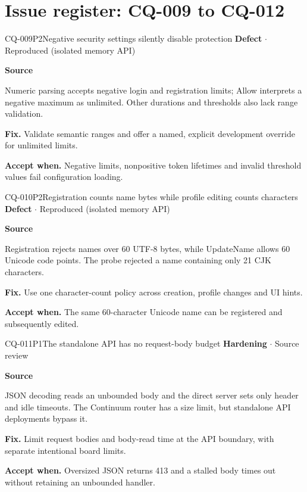 \section*{Issue register: CQ-009 to CQ-012}
\begin{finding}{CQ-009}{P2}{Negative security settings silently disable protection}
\textbf{Defect} $\cdot$ Reproduced (isolated memory API)\par
\textbf{Source}\quad{}\par
Numeric parsing accepts negative login and registration limits; Allow interprets a negative maximum as unlimited. Other durations and thresholds also lack range validation.\par
\textbf{Fix.} Validate semantic ranges and offer a named, explicit development override for unlimited limits.\par
\textbf{Accept when.} Negative limits, nonpositive token lifetimes and invalid threshold values fail configuration loading.
\end{finding}
\begin{finding}{CQ-010}{P2}{Registration counts name bytes while profile editing counts characters}
\textbf{Defect} $\cdot$ Reproduced (isolated memory API)\par
\textbf{Source}\quad{}\par
Registration rejects names over 60 UTF-8 bytes, while UpdateName allows 60 Unicode code points. The probe rejected a name containing only 21 CJK characters.\par
\textbf{Fix.} Use one character-count policy across creation, profile changes and UI hints.\par
\textbf{Accept when.} The same 60-character Unicode name can be registered and subsequently edited.
\end{finding}
\begin{finding}{CQ-011}{P1}{The standalone API has no request-body budget}
\textbf{Hardening} $\cdot$ Source review\par
\textbf{Source}\quad{}\par
JSON decoding reads an unbounded body and the direct server sets only header and idle timeouts. The Continuum router has a size limit, but standalone API deployments bypass it.\par
\textbf{Fix.} Limit request bodies and body-read time at the API boundary, with separate intentional board limits.\par
\textbf{Accept when.} Oversized JSON returns 413 and a stalled body times out without retaining an unbounded handler.
\end{finding}

